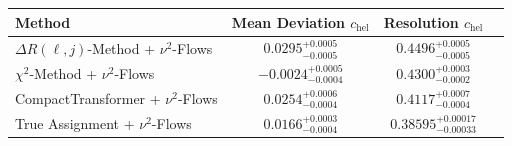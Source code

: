     \begin{tabular}{lccc}
        \toprule
        Method & Mean Deviation $c_{\text{hel}}$ & Resolution $c_{\text{hel}}$ \\
        \midrule
        $\Delta R(\ell,j)$-Method + $\nu^2$-Flows & $0.0295^{+0.0005}_{-0.0005}$ & $0.4496^{+0.0005}_{-0.0005}$ \\
        $\chi^2$-Method + $\nu^2$-Flows & $-0.0024^{+0.0005}_{-0.0004}$ & $0.4300^{+0.0003}_{-0.0002}$ \\
        CompactTransformer + $\nu^2$-Flows & $0.0254^{+0.0006}_{-0.0004}$ & $0.4117^{+0.0007}_{-0.0004}$ \\
        True Assignment + $\nu^2$-Flows & $0.0166^{+0.0003}_{-0.0004}$ & $0.38595^{+0.00017}_{-0.00033}$ \\
        \bottomrule
    \end{tabular}